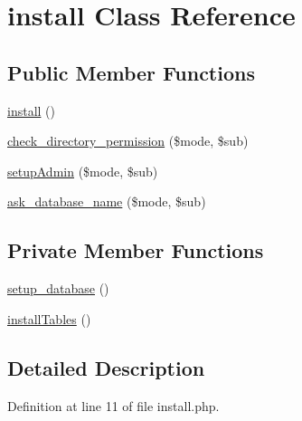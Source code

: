 \hypertarget{classinstall}{\section{install Class Reference}
\label{classinstall}
}
\subsection*{Public Member Functions}
\begin{DoxyCompactItemize}
\item 
\hyperlink{classinstall_a6a8bcb2f7b567c588f4a474d46804440}{install} ()
\item 
\hyperlink{classinstall_a4e720dd6e62b63da8033cecf60d5eaed}{check\-\_\-directory\-\_\-permission} (\$mode, \$sub)
\item 
\hyperlink{classinstall_a5c80f436b583ec38915827619d1e0fa1}{setup\-Admin} (\$mode, \$sub)
\item 
\hyperlink{classinstall_a27e554353c8f7b9eef9bc401f11765cf}{ask\-\_\-database\-\_\-name} (\$mode, \$sub)
\end{DoxyCompactItemize}
\subsection*{Private Member Functions}
\begin{DoxyCompactItemize}
\item 
\hyperlink{classinstall_a8b2e00c7cc9a5031e9c98b4b6aa2c035}{setup\-\_\-database} ()
\item 
\hyperlink{classinstall_a7d4d4748cd5c10e21c951a75e5a55f10}{install\-Tables} ()
\end{DoxyCompactItemize}


\subsection{Detailed Description}


Definition at line 11 of file install.\-php.



